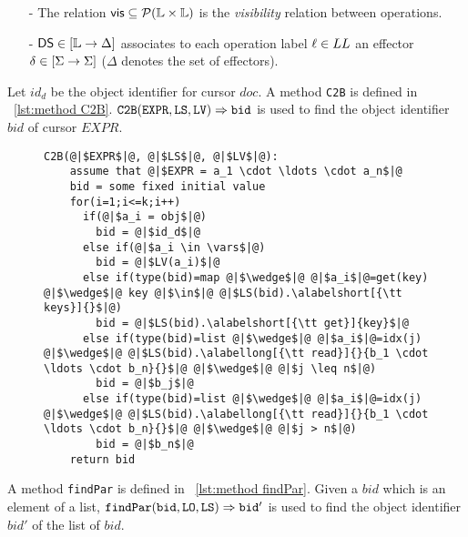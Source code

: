 {\begin{itemize}
\item[-] The relation $\mathsf{vis}\subseteq \mathcal{P}(\mathbb{L} \times \mathbb{L})$ is the \emph{visibility} relation between operations.

\item[-] $\mathsf{DS}\in [\mathbb{L} \rightarrow \Delta]$ associates to each operation label $\ell \in LL$ an effector $\delta\in [\Sigma \rightarrow \Sigma]$ ($\Delta$ denotes the set of effectors).
\end{itemize}

Let $id_d$ be the object identifier for cursor $doc$. A method {\tt C2B} is defined in \figureautorefname~\ref{lst:method C2B}. $\alabellong[{\tt C2B}]{EXPR,LS,LV}{bid}{}$ is used to find the object identifier $bid$ of cursor $EXPR$.

\begin{figure}[t]
\begin{lstlisting}[basicstyle=\ttfamily\scriptsize,caption={\vspace{-1mm}Method {\tt C2B}.},captionpos=b,label={lst:method C2B}]
  C2B(@|$EXPR$|@, @|$LS$|@, @|$LV$|@):
    assume that @|$EXPR = a_1 \cdot \ldots \cdot a_n$|@
    bid = some fixed initial value
    for(i=1;i<=k;i++)
      if(@|$a_i = obj$|@)
        bid = @|$id_d$|@
      else if(@|$a_i \in \vars$|@)
        bid = @|$LV(a_i)$|@
      else if(type(bid)=map @|$\wedge$|@ @|$a_i$|@=get(key) @|$\wedge$|@ key @|$\in$|@ @|$LS(bid).\alabelshort[{\tt keys}]{}$|@)
        bid = @|$LS(bid).\alabelshort[{\tt get}]{key}$|@
      else if(type(bid)=list @|$\wedge$|@ @|$a_i$|@=idx(j) @|$\wedge$|@ @|$LS(bid).\alabellong[{\tt read}]{}{b_1 \cdot \ldots \cdot b_n}{}$|@ @|$\wedge$|@ @|$j \leq n$|@)
        bid = @|$b_j$|@
      else if(type(bid)=list @|$\wedge$|@ @|$a_i$|@=idx(j) @|$\wedge$|@ @|$LS(bid).\alabellong[{\tt read}]{}{b_1 \cdot \ldots \cdot b_n}{}$|@ @|$\wedge$|@ @|$j > n$|@)
        bid = @|$b_n$|@
    return bid
\end{lstlisting}
\vspace{-5mm}
\end{figure}

A method {\tt findPar} is defined in \figureautorefname~\ref{lst:method findPar}. Given a $bid$ which is an element of a list, $\alabellong[{\tt findPar}]{bid,LO,LS}{bid'}{}$ is used to find the object identifier $bid'$ of the list of $bid$.

}
